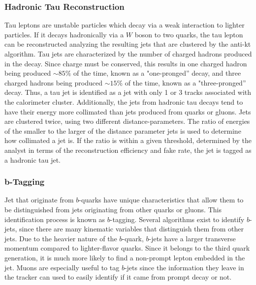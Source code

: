 \subsubsection{Hadronic Tau Reconstruction}
\label{tau_reco_overview}

\par Tau leptons are unstable particles which decay via a weak
interaction to lighter particles.  If it decays hadronically via a $W$
boson to two quarks, the tau lepton can be reconstructed analyzing the
resulting jets that are clustered by the anti-kt algorithm.  Tau jets
are characterized by the number of charged hadrons produced in the
decay.  Since charge must be conserved, this results in one charged
hadron being produced $\sim85\%$ of the time, known as a
"one-pronged'' decay, and three charged hadrons being produced
$\sim15\%$ of the time, known as a "three-pronged'' decay.  Thus, a
tau jet is identified as a jet with only 1 or 3 tracks associated with
the calorimeter cluster.  Additionally, the jets from hadronic tau
decays tend to have their energy more collimated than jets produced
from quarks or gluons.  Jets are clustered twice, using two different
distance-parameters.  The ratio of energies of the smaller to the larger of the
distance parameter jets is used to determine how collimated a jet is.
If the ratio is within a given threshold, determined by the analyst in
terms of the reconstruction efficiency and fake rate, the jet is
tagged as a hadronic tau jet. 

\subsubsection{b-Tagging}
\label{b_tagging_overview}

\par Jet that originate from $b$-quarks have unique characteristics
that allow them to be distinguished from jets originating from other
quarks or gluons. This identification process is known as
$b$-tagging.  Several algorithms exist to identify $b$-jets, since
there are many kinematic variables that distinguish them from other
jets.  Due to the heavier nature of the $b$-quark, $b$-jets have
a larger transverse momentum compared to lighter-flavor quarks.
Since it belongs to the third quark generation, it is much more likely
to find a non-prompt lepton embedded in the jet.  Muons are especially
useful to tag $b$-jets since the information they leave in the tracker
can used to easily identify if it came from prompt decay or not.  

